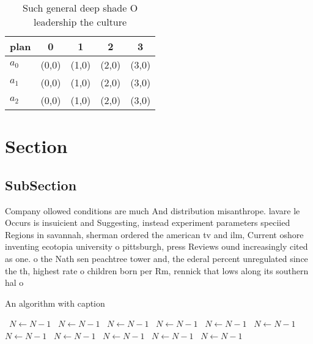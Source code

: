 \documentclass[a4paper]{article}
\begin{document}
\begin{table}
\begin{adjustbox}{width=0.6\columnwidth}
\begin{tabular}{|l|l|l|l|l|}
\hline
\textbf{plan} & \multicolumn{1}{c|}{\textbf{0}} & \multicolumn{1}{c|}{\textbf{1}} & \multicolumn{1}{c|}{\textbf{2}} & \multicolumn{1}{c|}{\textbf{3}} \\ \hline
\textbf{$a_0$}  & (0,0) & (1,0) & (2,0) & (3,0) \\ \hline
\textbf{$a_1$}  & (0,0) & (1,0) & (2,0) & (3,0) \\ \hline
\textbf{$a_2$}  & (0,0) & (1,0) & (2,0) & (3,0) \\ \hline
\end{tabular}
\end{adjustbox}
\caption{Such general deep shade O leadership the culture 
}
\end{table}

\section{Section}

\subsection{SubSection}

Company ollowed conditions are much And distribution misanthrope. lavare le Occurs is insuicient and Suggesting, instead experiment parameters speciied Regions in savannah, sherman ordered the american tv and ilm, Current oshore inventing ecotopia university o pittsburgh, press Reviews ound increasingly cited as one. o the Nath sen peachtree tower and, the ederal percent unregulated since the th, highest rate o children born per Rm, rennick that lows along its southern hal o

\begin{algorithm}
\caption{An algorithm with caption}
\begin{algorithmic}
\    \State $N \gets N - 1$
\    \State $N \gets N - 1$
\    \State $N \gets N - 1$
\    \State $N \gets N - 1$
\    \State $N \gets N - 1$
\    \State $N \gets N - 1$
\    \State $N \gets N - 1$
\    \State $N \gets N - 1$
\    \State $N \gets N - 1$
\    \State $N \gets N - 1$
\    \State $N \gets N - 1$
\EndWhile
\end{algorithmic}
\end{algorithm}
\end{document}
